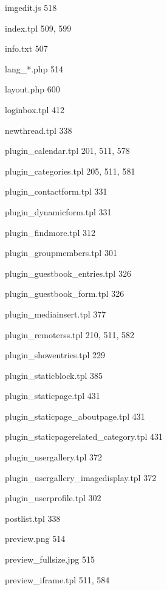 \documentclass{book}
\renewcommand\subitem{\par}
\begin{document}
\begin{multicols}{2}
\begin{osp-index}
    \subitem imgedit.js\hspace{1mm} 518
    \subitem index.tpl\hspace{1mm} 509, 599
    \subitem info.txt\hspace{1mm} 507
    \subitem lang\_*.php\hspace{1mm} 514
    \subitem layout.php\hspace{1mm} 600
    \subitem loginbox.tpl\hspace{1mm} 412
    \subitem newthread.tpl\hspace{1mm} 338
    \subitem plugin\_calendar.tpl\hspace{1mm} 201, 511, 578
    \subitem plugin\_categories.tpl\hspace{1mm} 205, 511, 581
    \subitem plugin\_contactform.tpl\hspace{1mm} 331
    \subitem plugin\_dynamicform.tpl\hspace{1mm} 331
    \subitem plugin\_findmore.tpl\hspace{1mm} 312
    \subitem plugin\_groupmembers.tpl\hspace{1mm} 301
    \subitem plugin\_guestbook\_entries.tpl\hspace{1mm} 326
    \subitem plugin\_guestbook\_form.tpl\hspace{1mm} 326
    \subitem plugin\_mediainsert.tpl\hspace{1mm} 377
    \subitem plugin\_remoterss.tpl\hspace{1mm} 210, 511, 582
    \subitem plugin\_showentries.tpl\hspace{1mm} 229
    \subitem plugin\_staticblock.tpl\hspace{1mm} 385
    \subitem plugin\_staticpage.tpl\hspace{1mm} 431
    \subitem plugin\_staticpage\_aboutpage.tpl\hspace{1mm} 431
    \subitem plugin\_staticpagerelated\_category.tpl\hspace{1mm} 431
    \subitem plugin\_usergallery.tpl\hspace{1mm} 372
    \subitem plugin\_usergallery\_imagedisplay.tpl\hspace{1mm} 372
    \subitem plugin\_userprofile.tpl\hspace{1mm} 302
    \subitem postlist.tpl\hspace{1mm} 338
    \subitem preview.png\hspace{1mm} 514
    \subitem preview\_fullsize.jpg\hspace{1mm} 515
    \subitem preview\_iframe.tpl\hspace{1mm} 511, 584

\end{osp-index}
\end{multicols}
\end{document}
